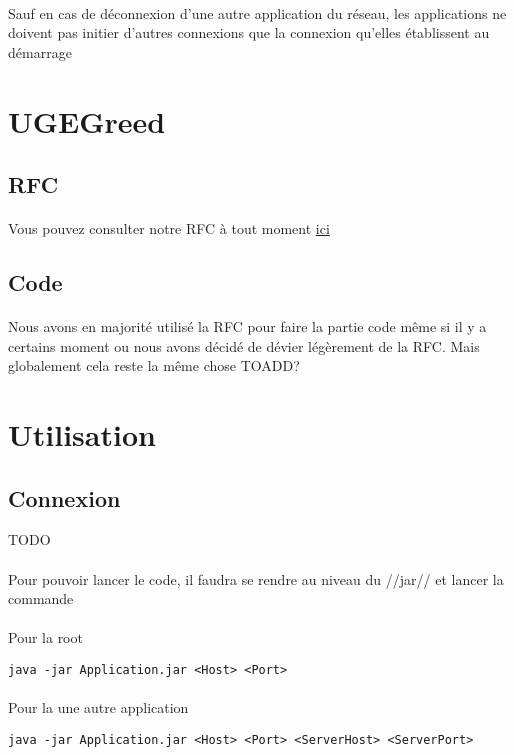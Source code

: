 \documentclass[a4paper,titlepage]{report}
\begin{document}
\paragraph{}
Sauf en cas de déconnexion d'une autre application du réseau, les applications ne doivent pas initier d'autres connexions que la connexion qu'elles établissent au démarrage
\pagebreak
\section{UGEGreed}
\subsection{RFC}
\paragraph{}
Vous pouvez consulter notre RFC à tout moment
\href {https://gitlab.com/Setsulys/ugegreed-debats-ly-ieng/-/blob/main/GreedRfc.md}{ici}
\subsection{Code}
\paragraph{}
Nous avons en majorité utilisé la RFC pour faire la partie code même si il y a certains moment ou nous avons décidé de dévier légèrement de la RFC. Mais globalement cela reste la même chose
\linebreak
TOADD?
\section{Utilisation}
\subsection{Connexion}
TODO
\paragraph{}
Pour pouvoir lancer le code, il faudra se rendre au niveau du //jar// et lancer la commande 
\paragraph{}
Pour la root
\begin{lstlisting}
java -jar Application.jar <Host> <Port>
\end{lstlisting}
\paragraph{}
Pour la une autre application
\begin{lstlisting}
java -jar Application.jar <Host> <Port> <ServerHost> <ServerPort>
\end{lstlisting}
\end{document}
